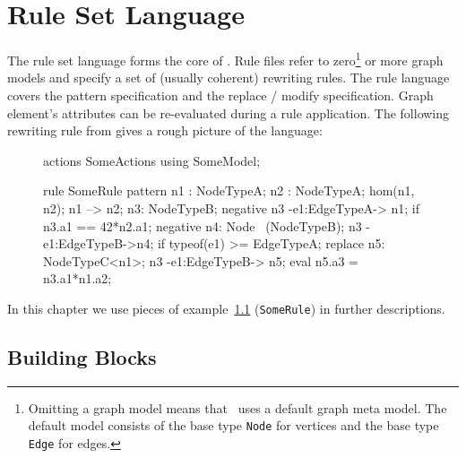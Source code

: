 \chapter{Rule Set Language}
\label{chaprulelang}

The rule set language forms the core of \GrG. Rule files refer to zero\footnote{Omitting a graph model means that \GrG\ uses a default graph meta model. The default model consists of the base type \texttt{Node} for vertices and the base type \texttt{Edge} for edges.} or more graph models and specify a set of (usually coherent) rewriting rules. The rule language covers the pattern specification and the replace / modify specification. Graph element's attributes can be re-evaluated during a rule application. The following rewriting rule from \cite{geiss} gives a rough picture of the language:
\begin{figure}[htbf]
\begin{example}\label{ex:rule:SomeRule}
\begin{grgen}
actions SomeActions using SomeModel;

rule SomeRule {
  pattern {
    n1 : NodeTypeA;
    n2 : NodeTypeA;
    hom(n1, n2);
    n1 --> n2;
    n3: NodeTypeB;
    negative {
      n3 -e1:EdgeTypeA-> n1;
      if {n3.a1 == 42*n2.a1;}
    }
    negative {
      n4: Node \ (NodeTypeB);
      n3 -e1:EdgeTypeB->n4;
      if {typeof(e1) >= EdgeTypeA;}
    }
  }
  replace {
    n5: NodeTypeC<n1>;
    n3 -e1:EdgeTypeB-> n5;
    eval {
      n5.a3 = n3.a1*n1.a2;
    }
  }  
}
\end{grgen}
\end{example}
\end{figure}
In this chapter we use pieces of example~\ref{ex:rule:SomeRule} (\texttt{SomeRule}) in further descriptions.

\section{Building Blocks}
\label{rulebb}


